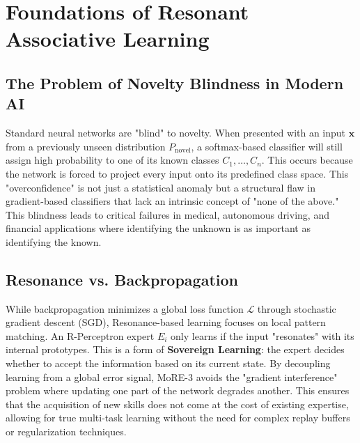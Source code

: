 \documentclass[11pt,hidelinks]{article}
\begin{document}
\section{Foundations of Resonant Associative Learning}
\subsection{The Problem of Novelty Blindness in Modern AI}
Standard neural networks are "blind" to novelty. When presented with an input $\mathbf{x}$ from a previously unseen distribution $P_{\text{novel}}$, a softmax-based classifier will still assign high probability to one of its known classes $C_1, \dots, C_n$. This occurs because the network is forced to project every input onto its predefined class space. This "overconfidence" is not just a statistical anomaly but a structural flaw in gradient-based classifiers that lack an intrinsic concept of "none of the above." This blindness leads to critical failures in medical, autonomous driving, and financial applications where identifying the unknown is as important as identifying the known.

\subsection{Resonance vs. Backpropagation}
While backpropagation minimizes a global loss function $\mathcal{L}$ through stochastic gradient descent (SGD), Resonance-based learning focuses on local pattern matching. An R-Perceptron expert $E_i$ only learns if the input "resonates" with its internal prototypes. This is a form of \textbf{Sovereign Learning}: the expert decides whether to accept the information based on its current state. By decoupling learning from a global error signal, MoRE-3 avoids the "gradient interference" problem where updating one part of the network degrades another. This ensures that the acquisition of new skills does not come at the cost of existing expertise, allowing for true multi-task learning without the need for complex replay buffers or regularization techniques.
\end{document}
